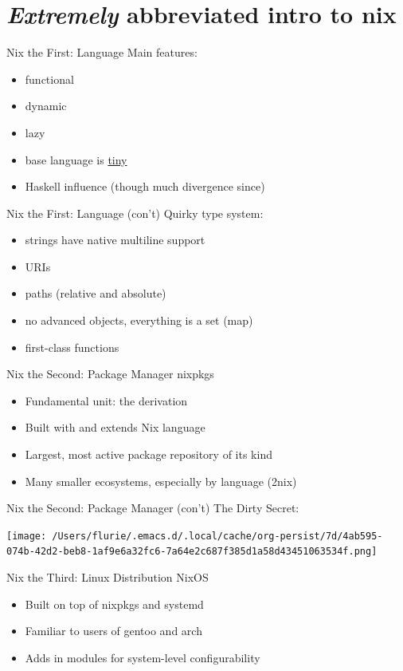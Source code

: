\documentclass[bigger]{beamer}
\begin{document}
\section{\emph{Extremely} abbreviated intro to nix}
\label{sec:orge4e4b5b}
\begin{frame}[label={sec:org92f11a4}]{Nix the First: Language}
Main features:
\begin{itemize}
\item functional
\item dynamic
\item lazy
\item base language is \uline{tiny}
\item Haskell influence (though much divergence since)
\end{itemize}
\end{frame}
\begin{frame}[label={sec:org221555e}]{Nix the First: Language (con't)}
Quirky type system:
\begin{itemize}
\item strings have native multiline support
\item URIs
\item paths (relative and absolute)
\item no advanced objects, everything is a set (map)
\item first-class functions
\end{itemize}
\end{frame}
\begin{frame}[label={sec:orgdba0189}]{Nix the Second: Package Manager}
nixpkgs
\begin{itemize}
\item Fundamental unit: the derivation
\item Built with and extends Nix language
\item Largest, most active package repository of its kind
\item Many smaller ecosystems, especially by language (2nix)
\end{itemize}
\end{frame}
\begin{frame}[label={sec:orgd417cc1}]{Nix the Second: Package Manager (con't)}
The Dirty Secret:
\begin{center}
\texttt{[image: /Users/flurie/.emacs.d/.local/cache/org-persist/7d/4ab595-074b-42d2-beb8-1af9e6a32fc6-7a64e2c687f385d1a58d43451063534f.png]}
\end{center}
\end{frame}
\begin{frame}[label={sec:org5bc54fd}]{Nix the Third: Linux Distribution}
NixOS
\begin{itemize}
\item Built on top of nixpkgs and systemd
\item Familiar to users of gentoo and arch
\item Adds in modules for system-level configurability
\end{itemize}
\end{frame}
\end{document}
